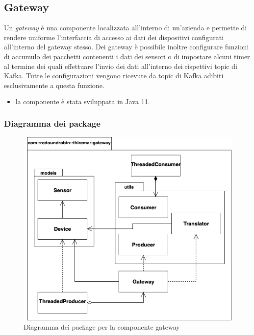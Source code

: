 \subsection{Gateway}
	Un \textit{gateway} è una componente localizzata all'interno di un'azienda e permette di rendere uniforme l'interfaccia di accesso ai dati dei dispositivi configurati all'interno del gateway stesso.
	Dei gateway è possibile inoltre configurare funzioni di accumulo dei pacchetti contenenti i dati dei sensori o di impostare alcuni timer al termine dei quali effettuare l'invio dei dati all'interno dei rispettivi topic di Kafka.
	Tutte le configurazioni vengono ricevute da topic di Kafka adibiti esclusivamente a questa funzione.
	\begin{itemize}
		\item la componente è stata sviluppata in Java 11.
	\end{itemize}
	
	\subsubsection{Diagramma dei package}%
	  	\begin{figure}[H]
			\centering
			\includegraphics[scale=0.550]{res/images/GATEWAY/GatewayPackage.png}
			\caption{Diagramma dei package per la componente gateway}
			\label{Diagramma 1}
		\end{figure}
		\newpage		

